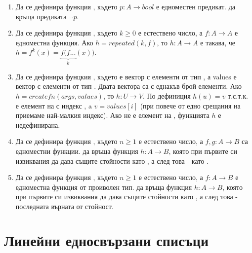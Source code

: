 \begin{enumerate}[resume]

  \item Да се дефинира функция , където $p:A \rightarrow bool$ е едноместен предикат.  да връща предиката $\neg p$.


  \item Да се дефинира функция , където $k \geq 0$ е естествено число, а $f:A \rightarrow A$ е едноместна функция. Ако $h=repeated(k,f)$, то $h:A \rightarrow A$ е такава, че $h=f^k(x)=\underbrace{f(f...}_{k}(x))$.

  \item Да се дефинира фунцкия , където  е вектор с елементи от тип , а values е вектор с елементи от тип . Двата вектора са с еднакъв брой елементи. Ако $h=createfn(args,values)$, то $h:U \rightarrow V$. По дефиниция $h(u)=v$ т.с.т.к.  е елемент на  с индекс , a $v=values[i]$ (при повече от едно срещания на  приемаме най-малкия индекс). Ако  не е елемент на , функцията $h$ е недефинирана.

  \item Да се дефинира функция , където $n \geq 1$ е естествено число, а $f,g:A \rightarrow B$ са едноместни функции.  да връща функция $h:A \rightarrow B$, която при първите си  извиквания да дава същите стойности като , а след това - като .


  \item Да се дефинира функция , където $n \geq 1$ е естествено число, а $f:A \rightarrow B$ е едноместна функция от проиволен тип.  да връща функция $h:A \rightarrow B$, която при първите си  извиквания да дава същите стойности като , а след това - последната върната от  стойност.
    
\end{enumerate}

\pagebreak

\clearpage\section{Линейни едносвързани списъци}

